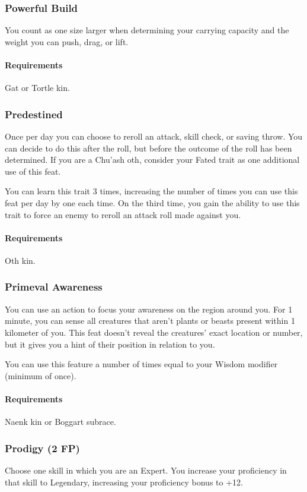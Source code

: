 \subsubsection{Powerful Build} \label{feat::powerfulbuild}
    You count as one size larger when determining your carrying capacity and the weight you can push, drag, or lift.
    \paragraph{Requirements} Gat or Tortle kin.
\subsubsection{Predestined} \label{feat::predenstined}
    Once per day you can choose to reroll an attack, skill check, or saving throw.
    You can decide to do this after the roll, but before the outcome of the roll has been determined.
    If you are a Chu'ash oth, consider your Fated trait as one additional use of this feat.

    You can learn this trait 3 times, increasing the number of times you can use this feat per day by one each time.
    On the third time, you gain the ability to use this trait to force an enemy to reroll an attack roll made against you.
    \paragraph{Requirements} Oth kin.
\subsubsection{Primeval Awareness} \label{feat::primevalawareness}
    You can use an action to focus your awareness on the region around you.
    For 1 minute, you can sense all creatures that aren't plants or beasts present within 1 kilometer of you.
    This feat doesn't reveal the creatures' exact location or number, but it gives you a hint of their position in relation to you.

    You can use this feature a number of times equal to your Wisdom modifier (minimum of once).
    \paragraph{Requirements} Naenk kin or Boggart subrace.
\subsubsection{Prodigy (2 FP)} \label{feat::prodigy}
    Choose one skill in which you are an Expert.
    You increase your proficiency in that skill to Legendary, increasing your proficiency bonus to +12.
